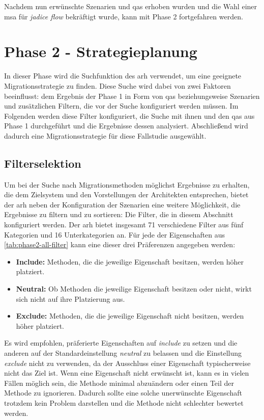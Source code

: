 Nachdem nun erwünschte Szenarien und \glspl{qa} erhoben wurden und die Wahl einer \gls{msa} für \emph{jadice flow} bekräftigt wurde, kann mit Phase 2 fortgefahren werden.

\section{Phase 2 - Strategieplanung}
\label{sec:durchführung-phase2}

In dieser Phase wird die Suchfunktion des \gls{arh} verwendet, um eine geeignete Migrationsstrategie zu finden.
Diese Suche wird dabei von zwei Faktoren beeinflusst: dem Ergebnis der Phase 1 in Form von \glspl{qa} beziehungsweise Szenarien und zusätzlichen Filtern, die vor der Suche konfiguriert werden müssen.
Im Folgenden werden diese Filter konfiguriert, die Suche mit ihnen und den \glspl{qa} aus Phase 1 durchgeführt und die Ergebnisse dessen analysiert.
Abschließend wird dadurch eine Migrationsstrategie für diese Fallstudie ausgewählt.

\subsection{Filterselektion}
\label{sec:filterselektion}

Um bei der Suche nach Migrationsmethoden möglichst Ergebnisse zu erhalten, die dem Zielsystem und den Vorstellungen der Architekten entsprechen, bietet der \gls{arh} neben der Konfiguration der Szenarien eine weitere Möglichkeit, die Ergebnisse zu filtern und zu sortieren:
Die Filter, die in diesem Abschnitt konfiguriert werden.
Der \gls{arh} bietet insgesamt 71 verschiedene Filter aus fünf Kategorien und 16 Unterkategorien an.
Für jede der Eigenschaften aus \cref{tab:phase2-all-filter} kann eine dieser drei Präferenzen angegeben werden:
\begin{itemize}
	\item \textbf{Include:} Methoden, die die jeweilige Eigenschaft besitzen, werden höher platziert.
	\item \textbf{Neutral:} Ob Methoden die jeweilige Eigenschaft besitzen oder nicht, wirkt sich nicht auf ihre Platzierung aus.
	\item \textbf{Exclude:} Methoden, die die jeweilige Eigenschaft nicht besitzen, werden höher platziert.
\end{itemize}



Es wird empfohlen, präferierte Eigenschaften auf \emph{include} zu setzen und die anderen auf der Standardeinstellung \emph{neutral} zu belassen und die Einstellung \emph{exclude} nicht zu verwenden, da der Ausschluss einer Eigenschaft typischerweise nicht das Ziel ist.
Wenn eine Eigenschaft nicht erwünscht ist, kann es in vielen Fällen möglich sein, die Methode minimal abzuändern oder einen Teil der Methode zu ignorieren.
Dadurch sollte eine solche unerwünschte Eigenschaft trotzdem kein Problem darstellen und die Methode nicht schlechter bewertet werden.


